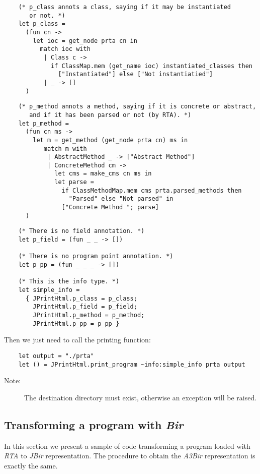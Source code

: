 \documentclass{article}
\begin{document}
\begin{verbatim}
    (* p_class annots a class, saying if it may be instantiated
       or not. *)
    let p_class =
      (fun cn ->
        let ioc = get_node prta cn in
          match ioc with
           | Class c ->
             if ClassMap.mem (get_name ioc) instantiated_classes then
               ["Instantiated"] else ["Not instantiatied"]
           | _ -> []
      )
\end{verbatim}
\begin{verbatim}
    (* p_method annots a method, saying if it is concrete or abstract,
       and if it has been parsed or not (by RTA). *)
    let p_method =
      (fun cn ms ->
        let m = get_method (get_node prta cn) ms in
           match m with
            | AbstractMethod _ -> ["Abstract Method"]
            | ConcreteMethod cm ->
              let cms = make_cms cn ms in
              let parse =
                if ClassMethodMap.mem cms prta.parsed_methods then
                  "Parsed" else "Not parsed" in
                ["Concrete Method "; parse]
      )
\end{verbatim}
\begin{verbatim}
    (* There is no field annotation. *)
    let p_field = (fun _ _ -> [])

    (* There is no program point annotation. *)
    let p_pp = (fun _ _ _ -> [])

    (* This is the info type. *)
    let simple_info = 
      { JPrintHtml.p_class = p_class;
        JPrintHtml.p_field = p_field;
        JPrintHtml.p_method = p_method;
        JPrintHtml.p_pp = p_pp }
\end{verbatim}
Then we just need to call the printing function:

\begin{verbatim}
    let output = "./prta"
    let () = JPrintHtml.print_program ~info:simple_info prta output
\end{verbatim}
\begin{description}
\item[Note:]
The destination directory must exist, otherwise an exception will
be raised.
\end{description}
\subsection{Transforming a program with \emph{Bir}}

In this section we present a sample of code transforming a program
loaded with \emph{RTA} to \emph{JBir} representation. The procedure
to obtain the \emph{A3Bir} representation is exactly the same.
\end{document}
